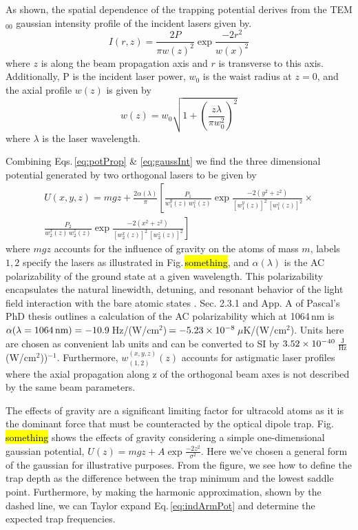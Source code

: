 As shown, the spatial dependence of the trapping potential derives from the TEM$_{00}$ gaussian intensity profile of the incident lasers given by.
\begin{equation} \label{eq:gaussInt}
	I(r,z) = \frac{2P}{\pi w(z)^2} \exp{\frac{-2 r^2}{w(x)^2}}
\end{equation}
where $z$ is along the beam propagation axis and $r$ is transverse to this axis.
Additionally, P is the incident laser power, $w_0$ is the waist radius at $z=0$, and the axial profile $w(z)$ is given by
\begin{equation}
	w(z) = w_0 \sqrt{1 + \left( \frac{z \lambda}{\pi w_0^2} \right)^2}
\end{equation}
where $\lambda$ is the laser wavelength.

Combining Eqs.\,\ref{eq:potProp} \& \ref{eq:gaussInt} we find the three dimensional potential generated by two orthogonal lasers to be given by
\begin{equation} \label{eq:indArmPot}
\begin{split}
	U(x,y,z) = m g z + \frac{2\alpha(\lambda)}{\pi} \left[ \frac{P_1}{w_1^y(z)\, w_1^z(z)} \exp{\frac{-2 (y^2+z^2)}{[w_1^y(z)]^2 \,[w_1^z(z)]^2}} \times \right. \\
	\left. \frac{P_2}{w_2^x(z)\, w_2^z(z)} \exp{\frac{-2 (x^2+z^2)}{[w_2^x(z)]^2\,[w_2^z(z)]^2}} \right]
\end{split}
\end{equation}
where $mgz$ accounts for the influence of gravity on the atoms of mass $m$, labels $1,2$ specify the lasers as illustrated in Fig.\,\hl{something}, and $\alpha(\lambda)$ is the AC polarizability of the ground state at a given wavelength.
This polarizability encapsulates the natural linewidth, detuning, and resonant behavior of the light field interaction with the bare atomic states \cite{Grimm1999a}.
Sec. 2.3.1 and App. A of Pascal's PhD thesis \cite{Mickelson2010b} outlines a calculation of the AC polarizability which at 1064\,nm is $\alpha( \lambda = \text{1064\,nm} ) = -10.9$\,Hz/(W/cm$^2$)\,$=-5.23\times 10^{-8}$\,$\mu$K/(W/cm$^2$).
Units here are chosen as convenient lab units and can be converted to SI by $3.52\times 10^{-40}$\,$\frac{\text{J}}{\text{Hz}}$\,(W/cm$^2$))$^{-1}$. 
Furthermore, $w_{(1,2)}^{(x,y,z)}(z)$ accounts for astigmatic laser profiles where the axial propagation along z of the orthogonal beam axes is not described by the same beam parameters.

The effects of gravity are a significant limiting factor for ultracold atoms as it is the dominant force that must be counteracted by the optical dipole trap.
Fig.\,\hl{something} shows the effects of gravity considering a simple one-dimensional gaussian potential, $U(z) = mgz + A\exp{\frac{-2z^2}{\sigma^2}}$.
Here we've chosen a general form of the gaussian for illustrative purposes.
From the figure, we see how to define the trap depth as the difference between the trap minimum and the lowest saddle point.
Furthermore, by making the harmonic approximation, shown by the dashed line, we can Taylor expand Eq.\,\ref{eq:indArmPot} and determine the expected trap frequencies.

